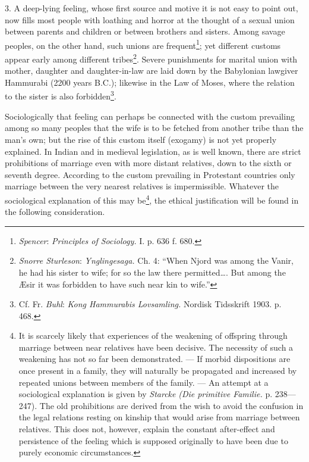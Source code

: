 \documentclass[12pt,a4paper,openany]{book}
\newcommand{\opage}[1]{\marginnote{\footnotesize\textit{[#1]}}}
\begin{document}
3. A deep-lying feeling, whose first source and motive it is not easy to point out, now fills most people with
loathing and horror at the thought of a sexual union between parents and children or between brothers and sisters. Among
savage peoples, on the other hand, such unions are frequent\footnote[3]{\emph{Spencer}: \textit{Principles of
Sociology.} I. p. 636 f. 680.};
\opage{302}yet different customs appear early among different tribes\footnote[1]{\emph{Snorre Sturleson}: \textit{Ynglingesaga.} Ch. 4: ``When Njord was among the Vanir, he had his sister to wife; for so the law there
permitted\dots{}. But among the Æsir it was forbidden to have such near kin to wife.''}. Severe punishments for marital
union with mother, daughter and daughter-in-law are laid down by the Babylonian lawgiver Hammurabi (2200 years B.C.);
likewise in the Law of Moses, where the relation to the sister is also forbidden\footnote[2]{Cf. Fr. \emph{Buhl}:
\textit{Kong Hammurabis Lovsamling.} Nordisk Tidsskrift 1903. p. 468.}.

Sociologically that feeling can perhaps be connected with the custom prevailing among so many peoples that the wife is
to be fetched from another tribe than the man's own; but the rise of this custom itself (exogamy) is not yet properly
explained. In Indian and in medieval legislation, as is well known, there are strict prohibitions of marriage even with
more distant relatives, down to the sixth or seventh degree. According to the custom prevailing in Protestant countries
only marriage between the very nearest relatives is impermissible. Whatever the sociological explanation of this may
be\footnote[3]{It is scarcely likely that experiences of the weakening of offspring through marriage between near
relatives have been decisive. The necessity of such a weakening has not so far been demonstrated. --- If morbid
dispositions are once present in a family, they will naturally be propagated and increased by repeated unions between
members of the family. --- An attempt at a sociological explanation is given by \emph{Starcke} \textit{(Die primitive
Familie.} p. 238---247). The old prohibitions are derived from the wish to avoid the confusion in the legal relations
resting on kinship that would arise from marriage between relatives. This does not, however, explain the constant
after-effect and persistence of the feeling which is supposed originally to have been due to purely economic
circumstances.}, the ethical justification will be found in the following consideration.
\end{document}
